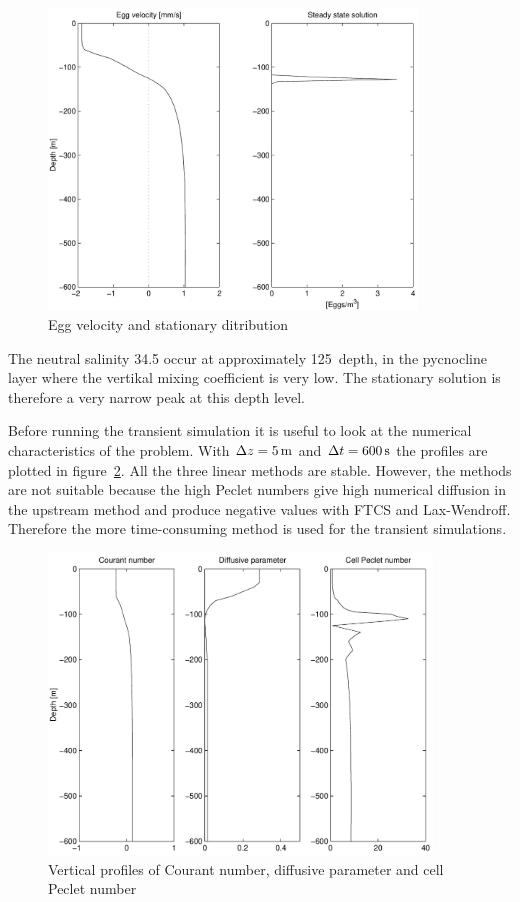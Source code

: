\begin{figure}[!htb]
\begin{center}
\includegraphics[height=8cm]{ex6b}
\end{center}
\caption{Egg velocity and stationary ditribution}
\label{fig:ex6b}
\end{figure}

The neutral salinity 34.5 occur at approximately 125\m\ depth, in the
pycnocline layer where the vertikal mixing coefficient is very
low. The stationary solution is therefore a very narrow peak at this
depth level.

Before running the transient simulation it is useful to look at the
numerical characteristics of the problem.  With $\Delta z = 5\, \mbox{m}$ and
$\Delta t = 600\, \mbox{s}$ the profiles are plotted in
figure~\ref{fig:ex6c}. 
All the three linear methods are stable.
However, the methods are not suitable because the high Peclet
numbers give high numerical diffusion in the upstream method and
produce negative values with FTCS and Lax-Wendroff. Therefore the more
time-consuming method  is used for the transient
simulations.


\begin{figure}[!htb]
\begin{center}
\includegraphics[height=8cm]{ex6c}
\end{center}
\caption{Vertical profiles of Courant number, diffusive parameter 
         and cell Peclet number}
\label{fig:ex6c}
\end{figure}

